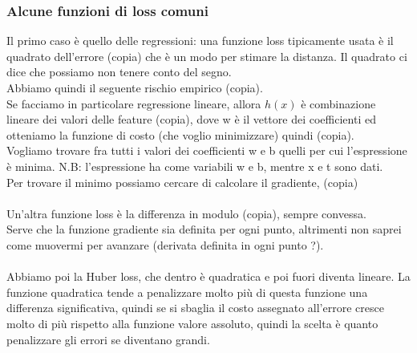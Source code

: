 \documentclass[12pt, oneside]{extbook}
\begin{document}
\subsubsection{Alcune funzioni di loss comuni}
Il primo caso è quello delle regressioni: una funzione loss tipicamente usata è il quadrato dell'errore (copia) che è un modo per stimare la distanza. Il quadrato ci dice che possiamo non tenere conto del segno.\\Abbiamo quindi il seguente rischio empirico (copia).\\Se facciamo in particolare regressione lineare, allora $h(x)$ è combinazione lineare dei valori delle feature (copia), dove w è il vettore dei coefficienti ed otteniamo la funzione di costo (che voglio minimizzare) quindi (copia).\\Vogliamo trovare fra tutti i valori dei coefficienti w e b quelli per cui l'espressione è minima. N.B: l'espressione ha come variabili w e b, mentre x e t sono dati.\\Per trovare il minimo possiamo cercare di calcolare il gradiente, (copia)\\\\Un'altra funzione loss è la differenza in modulo (copia), sempre convessa.\\Serve che la funzione gradiente sia definita per ogni punto, altrimenti non saprei come muovermi per avanzare (derivata definita in ogni punto ?).\\\\Abbiamo poi la Huber loss, che dentro è quadratica e poi fuori diventa lineare. La funzione quadratica tende a penalizzare molto più di questa funzione una differenza significativa, quindi se si sbaglia il costo assegnato all'errore cresce molto di più rispetto alla funzione valore assoluto, quindi la scelta è quanto penalizzare gli errori se diventano grandi.
\end{document}
